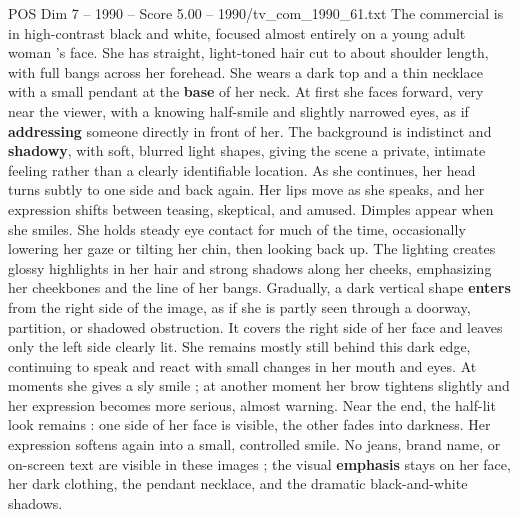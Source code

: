 \begin{textsample}{POS Dim 7 – 1990 – Score 5.00 – 1990/tv\_com\_1990\_61.txt}  \label{ex:f7_pos_068}
The commercial is in high-contrast black and white, focused almost entirely on a young adult woman ’s face.
She has straight, light-toned hair cut to about shoulder length, with full bangs across her forehead.
She wears a dark top and a thin necklace with a small pendant at the \textbf{base} of her neck.
At first she faces forward, very near the viewer, with a knowing half-smile and slightly narrowed eyes, as if \textbf{addressing} someone directly in front of her.
The background is indistinct and \textbf{shadowy}, with soft, blurred light shapes, giving the scene a private, intimate feeling rather than a clearly identifiable location.
As she continues, her head turns subtly to one side and back again.
Her lips move as she speaks, and her expression shifts between teasing, skeptical, and amused.
Dimples appear when she smiles.
She holds steady eye contact for much of the time, occasionally lowering her gaze or tilting her chin, then looking back up.
The lighting creates glossy highlights in her hair and strong shadows along her cheeks, emphasizing her cheekbones and the line of her bangs.
Gradually, a dark vertical shape \textbf{enters} from the right side of the image, as if she is partly seen through a doorway, partition, or shadowed obstruction.
It covers the right side of her face and leaves only the left side clearly lit.
She remains mostly still behind this dark edge, continuing to speak and react with small changes in her mouth and eyes.
At moments she gives a sly smile ; at another moment her brow tightens slightly and her expression becomes more serious, almost warning.
Near the end, the half-lit look remains : one side of her face is visible, the other fades into darkness.
Her expression softens again into a small, controlled smile.
No jeans, brand name, or on-screen text are visible in these images ; the visual \textbf{emphasis} stays on her face, her dark clothing, the pendant necklace, and the dramatic black-and-white shadows.

\end{textsample}
